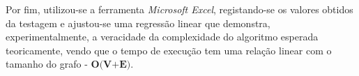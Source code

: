 \documentclass[12pt]{article}
\begin{document}
Por fim, utilizou-se a ferramenta \emph{Microsoft Excel}, registando-se os valores obtidos da testagem e  ajustou-se uma regressão linear que demonstra, experimentalmente, a veracidade da complexidade do algoritmo esperada teoricamente, vendo que o tempo de execução tem uma relação linear com o tamanho do grafo - $\textbf{O(V+E)}$.
\end{document}

